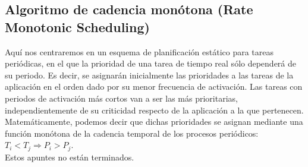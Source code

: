 \subsection{Algoritmo de cadencia monótona (Rate Monotonic Scheduling)}
Aquí nos centraremos en un esquema de planificación estático para tareas periódicas, en el que la prioridad de una tarea de tiempo real sólo dependerá de su periodo. Es decir, se asignarán inicialmente las prioridades a las tareas de la aplicación en el orden dado por su menor frecuencia de activación. Las tareas con periodos de activación más cortos van a ser las más prioritarias, independientemente de su criticidad respecto de la aplicación a la que pertenecen. Matemáticamente, podemos decir que dichas prioridades se asignan mediante una función monótona de la cadencia temporal de los procesos periódicos: $T_i<T_j\Longrightarrow P_i > P_j$.\\

Estos apuntes no están terminados.

